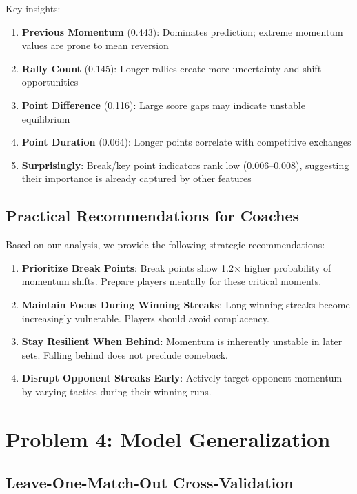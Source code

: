 \documentclass{mcmthesis}
\begin{document}
Key insights:
\begin{enumerate}
    \item \textbf{Previous Momentum} (0.443): Dominates prediction; extreme momentum values are prone to mean reversion
    \item \textbf{Rally Count} (0.145): Longer rallies create more uncertainty and shift opportunities
    \item \textbf{Point Difference} (0.116): Large score gaps may indicate unstable equilibrium
    \item \textbf{Point Duration} (0.064): Longer points correlate with competitive exchanges
    \item \textbf{Surprisingly}: Break/key point indicators rank low (0.006--0.008), suggesting their importance is already captured by other features
\end{enumerate}

\subsection{Practical Recommendations for Coaches}

Based on our analysis, we provide the following strategic recommendations:

\begin{enumerate}
    \item \textbf{Prioritize Break Points}: Break points show 1.2$\times$ higher probability of momentum shifts. Prepare players mentally for these critical moments.
    \item \textbf{Maintain Focus During Winning Streaks}: Long winning streaks become increasingly vulnerable. Players should avoid complacency.
    \item \textbf{Stay Resilient When Behind}: Momentum is inherently unstable in later sets. Falling behind does not preclude comeback.
    \item \textbf{Disrupt Opponent Streaks Early}: Actively target opponent momentum by varying tactics during their winning runs.
\end{enumerate}

\section{Problem 4: Model Generalization}

\subsection{Leave-One-Match-Out Cross-Validation}
\end{document}
